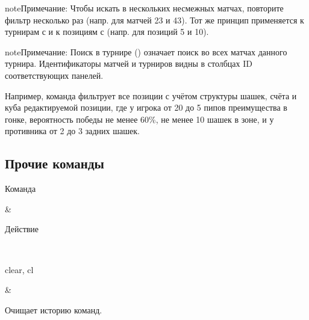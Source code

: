 \documentclass[letterpaper,10pt,russian]{sphinxmanual}
\begin{document}
\begin{sphinxadmonition}{note}{Примечание:}
\sphinxAtStartPar
Чтобы искать в нескольких несмежных матчах, повторите фильтр  несколько раз (напр.  для матчей 23 и 43). Тот же принцип применяется к турнирам с  и к позициям с  (напр.  для позиций 5 и 10).
\end{sphinxadmonition}

\begin{sphinxadmonition}{note}{Примечание:}
\sphinxAtStartPar
Поиск в турнире () означает поиск во всех матчах данного турнира. Идентификаторы матчей и турниров видны в столбцах ID соответствующих панелей.
\end{sphinxadmonition}

\sphinxAtStartPar
Например, команда  фильтрует все позиции с учётом структуры шашек, счёта и куба редактируемой позиции, где у игрока от 20 до 5 пипов преимущества в гонке, вероятность победы не менее 60\%, не менее 10 шашек в зоне, и у противника от 2 до 3 задних шашек.


\subsection{Прочие команды}
\label{\detokenize{cmd_mode:commandes-diverses}}\label{\detokenize{cmd_mode:cmd-misc}}

\begin{savenotes}\sphinxattablestart
\sphinxthistablewithglobalstyle
\centering
\begin{tabular}[t]{}
\sphinxtoprule
\begin{varwidth}[t]{}
\sphinxstyletheadfamily \sphinxAtStartPar
Команда
\sphinxbeforeendvarwidth
\end{varwidth}%
&\begin{varwidth}[t]{}
\sphinxstyletheadfamily \sphinxAtStartPar
Действие
\sphinxbeforeendvarwidth
\end{varwidth}%
\\
\sphinxmidrule
\sphinxtableatstartofbodyhook\begin{varwidth}[t]{}
\sphinxAtStartPar
clear, cl
\sphinxbeforeendvarwidth
\end{varwidth}%
&\begin{varwidth}[t]{}
\sphinxAtStartPar
Очищает историю команд.
\sphinxbeforeendvarwidth
\end{varwidth}%
\\
\sphinxbottomrule
\end{tabular}
\sphinxtableafterendhook\par
\sphinxattableend\end{savenotes}
\end{document}
